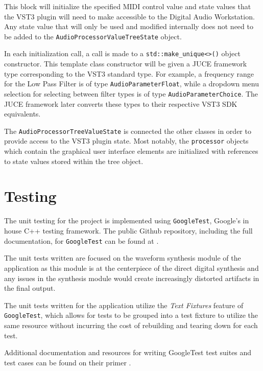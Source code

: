 \documentclass[a4paper,12pt]{report}
\begin{document}
This block will initialize the specified MIDI control value and state values that the VST3 plugin will need to make accessible to the Digital Audio Workstation. Any state value that will only be used and modified internally does not need to be added to the \texttt{Audio\-Processor\-Value\-Tree\-State} object.

In each initialization call, a call is made to a \texttt{std::make\_unique<>()} object constructor. This template class constructor will be given a JUCE framework type corresponding to the VST3 standard type. For example, a frequency range for the Low Pass Filter is of type \texttt{Audio\-Parameter\-Float}, while a dropdown menu selection for selecting between filter types is of type \texttt{Audio\-Parameter\-Choice}. The JUCE framework later converts these types to their respective VST3 SDK equivalents.

The \texttt{Audio\-Processor\-Tree\-Value\-State} is connected the other classes in order to provide access to the VST3 plugin state. Most notably, the \texttt{processor} objects which contain the graphical user interface elements are initialized with references to state values stored within the tree object.

\section{Testing}
\label{sec:testing}
The unit testing for the project is implemented using \texttt{Google\-Test}, Google's in house C++ testing framework. The public Github repository, including the full documentation, for \texttt{Google\-Test} can be found at \cite{googletest}.

The unit tests written are focused on the waveform synthesis module of the application as this module is at the centerpiece of the direct digital synthesis and any issues in the synthesis module would create increasingly distorted artifacts in the final output.

The unit tests written for the application utilize the \emph{Text Fixtures} feature of \texttt{Google\-Test}, which allows for tests to be grouped into a test fixture to utilize the same resource without incurring the cost of rebuilding and tearing down for each test. 

Additional documentation and resources for writing GoogleTest test suites and test cases can be found on their primer \cite{googletestprimer}.
\end{document}
